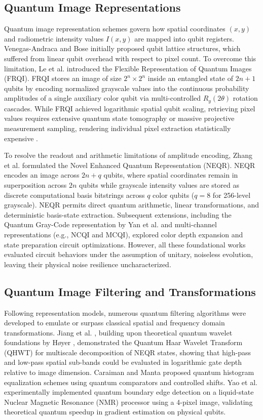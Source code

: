 \documentclass[12pt,onecolumn,draftclsnofoot]{IEEEtran}
\begin{document}
\subsection{Quantum Image Representations}
Quantum image representation schemes govern how spatial coordinates $(x, y)$ and radiometric intensity values $I(x, y)$ are mapped into qubit registers. Venegas-Andraca and Bose initially proposed qubit lattice structures, which suffered from linear qubit overhead with respect to pixel count. To overcome this limitation, Le et al. \cite{le2011flexible} introduced the Flexible Representation of Quantum Images (FRQI). FRQI stores an image of size $2^n \times 2^n$ inside an entangled state of $2n + 1$ qubits by encoding normalized grayscale values into the continuous probability amplitudes of a single auxiliary color qubit via multi-controlled $R_y(2\theta)$ rotation cascades. While FRQI achieved logarithmic spatial qubit scaling, retrieving pixel values requires extensive quantum state tomography or massive projective measurement sampling, rendering individual pixel extraction statistically expensive \cite{le2011flexible}.

To resolve the readout and arithmetic limitations of amplitude encoding, Zhang et al. \cite{zhang2013neqr} formulated the Novel Enhanced Quantum Representation (NEQR). NEQR encodes an image across $2n + q$ qubits, where spatial coordinates remain in superposition across $2n$ qubits while grayscale intensity values are stored as discrete computational basis bitstrings across $q$ color qubits ($q=8$ for 256-level grayscale). NEQR permits direct quantum arithmetic, linear transformations, and deterministic basis-state extraction. Subsequent extensions, including the Quantum Gray-Code representation by Yan et al. \cite{yan2016quantum} and multi-channel representations (e.g., NCQI and MCQI), explored color depth expansion and state preparation circuit optimizations. However, all these foundational works evaluated circuit behaviors under the assumption of unitary, noiseless evolution, leaving their physical noise resilience uncharacterized.

\subsection{Quantum Image Filtering and Transformations}
Following representation models, numerous quantum filtering algorithms were developed to emulate or surpass classical spatial and frequency domain transformations. Jiang et al. \cite{jiang2015quantum}, building upon theoretical quantum wavelet foundations by H{\o}yer \cite{hoyer1997efficient}, demonstrated the Quantum Haar Wavelet Transform (QHWT) for multiscale decomposition of NEQR states, showing that high-pass and low-pass spatial sub-bands could be evaluated in logarithmic gate depth relative to image dimension. Caraiman and Manta \cite{caraiman2014histogram} proposed quantum histogram equalization schemes using quantum comparators and controlled shifts. Yao et al. \cite{yao2017quantum} experimentally implemented quantum boundary edge detection on a liquid-state Nuclear Magnetic Resonance (NMR) processor using a 4-pixel image, validating theoretical quantum speedup in gradient estimation on physical qubits.
\end{document}
